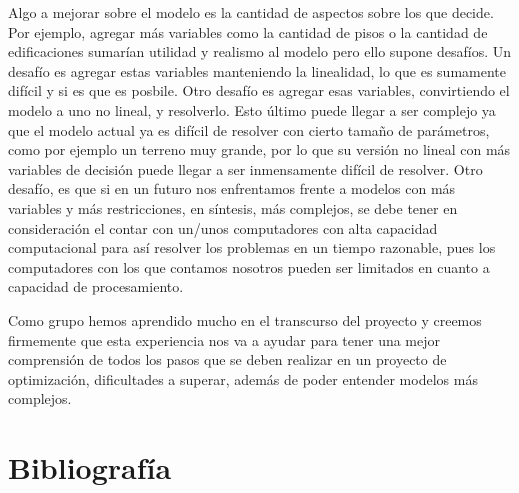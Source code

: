\documentclass[letterpaper]{article}
\begin{document}
Algo a mejorar sobre el modelo es la cantidad de aspectos sobre los que decide. Por ejemplo, agregar más variables como la cantidad de pisos o la cantidad de edificaciones	sumarían utilidad y realismo 
al modelo pero ello supone desafíos. Un desafío es agregar estas variables manteniendo la linealidad, lo que es sumamente difícil y si es que es posbile. Otro desafío es agregar esas variables, convirtiendo 
el modelo a uno no lineal, y resolverlo. Esto último puede llegar a ser complejo ya que el modelo actual ya es difícil de resolver con cierto tamaño de parámetros, como por ejemplo un terreno muy grande, 
por lo que su versión no lineal con más variables de decisión puede llegar a ser inmensamente difícil de resolver. Otro desafío, es que si en un futuro nos enfrentamos frente a modelos con más variables y 
más restricciones, en síntesis, más complejos, se debe tener en consideración el contar con un/unos computadores con alta capacidad computacional para así resolver los problemas en un tiempo razonable, pues 
los computadores con los que contamos nosotros pueden ser limitados en cuanto a capacidad de procesamiento. \newline \newline

Como grupo hemos aprendido mucho en el transcurso del proyecto y creemos firmemente que esta experiencia nos va a ayudar para tener una mejor comprensión de todos los pasos que se deben realizar en un proyecto
de optimización, dificultades a superar, además de poder entender modelos más complejos.

\newpage
\section{Bibliografía}



\end{document}
